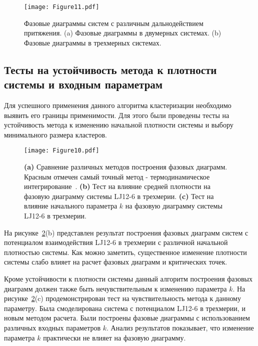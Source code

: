 \begin{figure}[!t]
    \centering
    \texttt{[image: Figure11.pdf]}
    \caption{Фазовые диаграммы систем с различным дальнодействием притяжения.
    (a) Фазовые диаграммы в двумерных системах.
    (b) Фазовые диаграммы в трехмерных системах.}
    \label{phase_diagram}
\end{figure}

\subsection{Тесты на устойчивость метода к плотности системы и входным параметрам}
\label{PRIMe-SubSecTests}


Для успешного применения данного алгоритма кластеризации необходимо выявить его границы применимости.
Для этого были проведены тесты на устойчивость метода к изменению начальной плотности системы и выбору минимального размера кластеров.

\begin{figure}[!t]
    \centering
    \texttt{[image: Figure10.pdf]}
    \caption{\textbf{(a)} Сравнение различных методов построения фазовых диаграмм. Красным отмечен самый точный метод - термодинамическое интегрирование~\cite{10.1080/00268976.2019.1699185}.
             \textbf{(b)} Тест на влияние средней плотности на фазовую диаграмму системы LJ12-6 в трехмерии.
             \textbf{(c)} Тест на влияние начального параметра $k$ на фазовую диаграмму системы LJ12-6 в трехмерии.}
    \label{tests}
\end{figure}



На рисунке~\ref{tests}(b) представлен результат построения фазовых диаграмм систем с потенциалом взаимодействия LJ12-6 в трехмерии с различной начальной плотностью системы. Как можно заметить, существенное изменение плотности системы слабо влияет на расчет фазовых диаграмм и критических точек.



Кроме устойчивости к плотности системы данный алгоритм построения фазовых диаграмм должен также быть нечувствительным к изменению параметра $k$.
На рисунке~\ref{tests}(c) продемонстрирован тест на чувствительность метода к данному параметру.
Была смоделирована система с потенциалом LJ12-6 в трехмерии, и новым методом расчета.
Были построены фазовые диаграммы с использованием различных входных параметров $k$.
Анализ результатов показывает, что изменение параметра $k$ практически не влияет на фазовую диаграмму.


